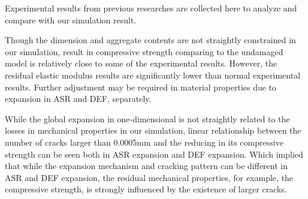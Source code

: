Experimental results from previous researches are collected here to analyze and compare with our simulation result.

Though the dimension and aggregate contents are not straightly constrained in our simulation, result in compressive strength comparing to the undamaged model is relatively close to some of the experimental results. However, the residual elastic modulus results are significantly lower than normal experimental results. Further adjustment may be required in material properties due to expansion in ASR and DEF, separately.

While the global expansion in one-dimensional is not straightly related to the losses in mechanical properties in our simulation, linear relationship between the number of cracks larger than 0.0005mm and the reducing in its compressive strength can be seen both in ASR expansion and DEF expansion. Which implied that while the expansion mechanism and cracking pattern can be different in ASR and DEF expansion, the residual mechanical properties, for example, the compressive strength, is strongly influenced by the existence of larger cracks.
